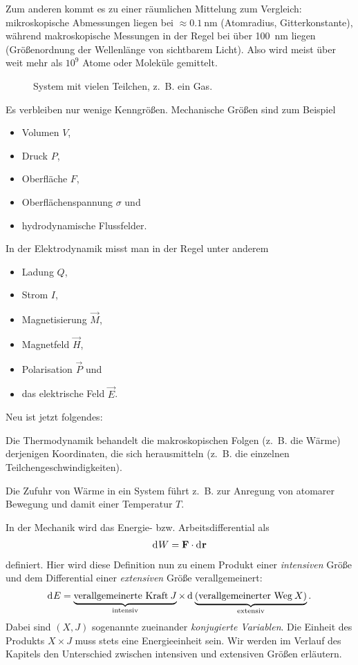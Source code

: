 Zum anderen kommt es zu einer räumlichen Mittelung \textendash{} zum Vergleich: mikroskopische Abmessungen liegen bei $\approx\SI{0.1}{\nm}$ (Atomradius, Gitterkonstante), während makroskopische Messungen in der Regel bei über \SI{100}{\nm} liegen (Größenordnung der Wellenlänge von sichtbarem Licht).
Also wird meist über weit mehr als $10^{9}$ Atome oder Moleküle gemittelt.

\begin{figure}[htbp]
    \centering
    \tfigSystemWithManyParticles
    \caption{System mit vielen Teilchen, z.~B. ein Gas.}
    \label{fig:SystemWithManyParticles}
\end{figure}

Es verbleiben nur wenige Kenngrößen. Mechanische Größen sind zum Beispiel
\begin{itemize}
    \item Volumen $V$,
    \item Druck $P$,
    \item Oberfläche $F$,
    \item Oberflächenspannung $\sigma$ und
    \item hydrodynamische Flussfelder.
\end{itemize}

In der Elektrodynamik misst man in der Regel unter anderem
\begin{itemize}
    \item Ladung $Q$,
    \item Strom $I$,
    \item Magnetisierung $\vec M$,
    \item Magnetfeld $\vec H$,
    \item Polarisation $\vec P$ und
    \item das elektrische Feld $\vec E$.
\end{itemize}

Neu ist jetzt folgendes:
\begin{formal}
    Die Thermodynamik behandelt die makroskopischen Folgen (z.~B. die Wärme) derjenigen Koordinaten, die sich herausmitteln (z.~B. die einzelnen Teilchengeschwindigkeiten).%
\end{formal}

Die Zufuhr von Wärme in ein System führt z.~B. zur Anregung von atomarer Bewegung und damit einer Temperatur $T$.

In der Mechanik wird das Energie- bzw. Arbeitsdifferential als
\begin{align*}
    \mathop{\mathrm{d}^{}W} = \mathbf{F}\cdot\mathop{\mathrm{d}^{}\mathbf{r}}
\end{align*}
definiert. Hier wird diese Definition nun zu einem Produkt einer \emph{intensiven} Größe und dem Differential einer \emph{extensiven} Größe verallgemeinert:
\begin{align*}
    \mathop{\mathrm{d}^{}E} = \underbrace{\text{verallgemeinerte Kraft}\: J}_{\text{intensiv}} \times \mathop{\mathrm{d}^{}\underbrace{(\text{verallgemeinerter Weg}\: X)}_{\text{extensiv}}}.
\end{align*}
Dabei sind $(X,J)$ sogenannte zueinander \emph{konjugierte Variablen}. Die Einheit des Produkts $X\times J$ muss stets eine Energieeinheit sein. Wir werden im Verlauf des Kapitels den Unterschied zwischen intensiven und extensiven Größen erläutern. 

